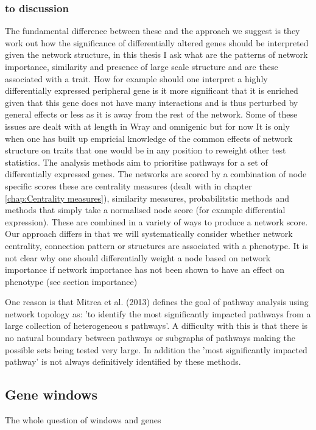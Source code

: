 \subsubsection{to discussion}
\label{sec:other network gsa intro discussion}
The fundamental difference between these and the approach we suggest is they work out how the significance of differentially altered genes should be interpreted given the network structure, in this thesis I ask what are the patterns of network importance, similarity and presence of large scale structure and are these associated with a trait. How for example should one interpret a highly differentially expressed peripheral gene  is it more significant that it is enriched given that this gene does not have many interactions and is thus perturbed by general effects or less as it is away from the rest of the network. Some of these issues are dealt with at length in Wray and omnigenic but for now  It is only when one has built up empricial knowledge of the common effects of network structure on traits that one would be in any position to reweight other test statistics. The analysis methods aim to prioritise pathways for a set of differentially expressed genes. The networks are scored by a combination of node specific scores these are centrality measures (dealt with in chapter \ref{chap:Centrality measures}), similarity measures, probabilitstic methods and methods that simply take a normalised node score (for example differential expression). These are combined in a variety of ways to produce a network score. Our approach differs in that we will systematically consider whether network centrality, connection pattern or structures are associated with a phenotype. It is not clear why one should differentially weight a node based on network importance if network importance has not been shown to have an effect on phenotype (see section importance)

One reason is that Mitrea et al. (2013) \cite{mitra2013integrative} defines the goal of pathway analysis using network topology as: 'to identify the most significantly impacted pathways from a large collection of heterogeneou s pathways'. A difficulty with this is that there is no natural boundary between pathways or subgraphs of pathways making the possible sets being tested very large. In addition the 'most significantly impacted pathway' is not always definitively identified by these methods. 

\subsection{Gene windows}
\label{sec:discussion_gene_windows}
The whole question of windows and genes 

